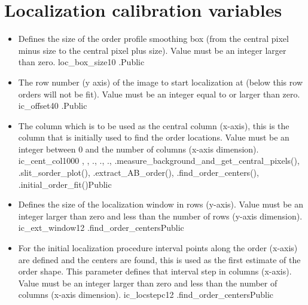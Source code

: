 \section{Localization calibration variables}
\label{ch:variables:localization}

\begin{itemize}

\item {}
{Defines the size of the order profile smoothing box (from the central pixel minus size to the central pixel plus size). Value must be an integer larger than zero.}
{loc\_box\_size}{10}
{\callocRAW}{\constantsfile}
{\callocRAW.\progMAIN}{Public}


\item {}
{The row number (y axis) of the image to start localization at (below this row orders will not be fit). Value must be an integer equal to or larger than zero.}
{ic\_offset}{40}
{\callocRAW}{\constantsfile}
{\callocRAW.\progMAIN }{Public}

\item {}
{The column which is to be used as the central column (x-axis), this is the column that is initially used to find the order locations. Value must be an integer between 0 and the number of columns (x-axis dimension).}
{ic\_cent\_col}{1000}
{\callocRAW, \calFFraw, \calextractRAW}{\constantsfile}
{\callocRAW.\progMAIN, \calFFraw.\progMAIN, \calextractRAW.\progMAIN, \spirouBACK.measure\_background\_{\hskip 0pt}and\_get\_central\_pixels(), \spirouPlot.slit\_sorder\_plot(), \spirouEXTOR.extract\_AB\_order(), \spirouLOCOR.find\_order\_centers(), \spirouLOCOR.initial\_order\_fit()}{Public}

\item {}
{Defines the size of the localization window in rows (y-axis). Value must be an integer larger than zero and less than the number of rows (y-axis dimension).}
{ic\_ext\_window}{12}
{\callocRAW}{\constantsfile}
{\spirouLOCOR.find\_order\_centers}{Public}

\item {}
{For the initial localization procedure interval points along the order (x-axis) are defined and the centers are found, this is used as the first estimate of the order shape. This parameter defines that interval step in columns (x-axis). Value must be an integer larger than zero and less than the number of columns (x-axis dimension).}
{ic\_locstepc}{12}
{\callocRAW}{\constantsfile}
{\spirouLOCOR.find\_order\_centers}{Public}


\end{itemize}
